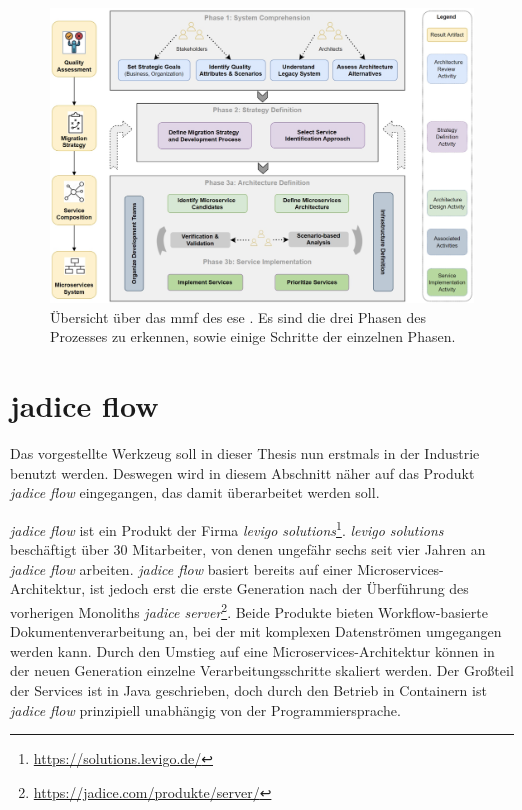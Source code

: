 \begin{figure}
	\centering
	\includegraphics[width=\textwidth]{figures/mmf-overview}
	\caption[\acrfull{mmf} Übersicht]{
		Übersicht über das \gls{mmf} des \gls{ese} \cite{fritzsch2022architecturecentric}. Es sind die drei Phasen des Prozesses zu erkennen, sowie einige Schritte der einzelnen Phasen.
	}
	\label{fig:mmf-overview}
\end{figure}

\section{jadice flow}

Das vorgestellte Werkzeug soll in dieser Thesis nun erstmals in der Industrie benutzt werden.
Deswegen wird in diesem Abschnitt näher auf das Produkt \emph{jadice flow} eingegangen, das damit überarbeitet werden soll.

\emph{jadice flow} ist ein Produkt der Firma \emph{levigo solutions}\footnote{\url{https://solutions.levigo.de/}}.
\emph{levigo solutions} beschäftigt über 30 Mitarbeiter, von denen ungefähr sechs seit vier Jahren an \emph{jadice flow} arbeiten.
\emph{jadice flow} basiert bereits auf einer Microservices-Architektur, ist jedoch erst die erste Generation nach der Überführung des vorherigen Monoliths \emph{jadice server}\footnote{\url{https://jadice.com/produkte/server/}}.
Beide Produkte bieten Workflow-basierte Dokumentenverarbeitung an, bei der mit komplexen Datenströmen umgegangen werden kann.
Durch den Umstieg auf eine Microservices-Architektur können in der neuen Generation einzelne Verarbeitungsschritte skaliert werden.
Der Großteil der Services ist in Java geschrieben, doch durch den Betrieb in Containern ist \emph{jadice flow} prinzipiell unabhängig von der Programmiersprache.

